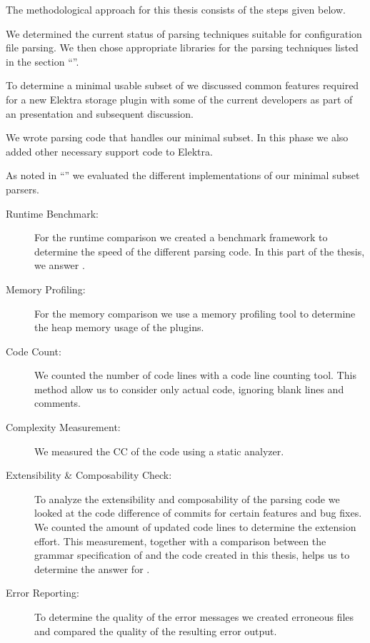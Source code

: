 The methodological approach for this thesis consists of the steps given below.

\begin{description}[style=multiline, leftmargin=3.2cm, font=\bfseries]

  \item[Literature Review] We determined the current status of parsing techniques suitable for configuration file parsing. We then chose appropriate libraries for the parsing techniques listed in the section “”.

  \item[Discussion] To determine a minimal usable subset of  we discussed common features required for a new Elektra storage plugin with some of the current developers as part of an presentation and subsequent discussion.

  \item[Implementation] We wrote parsing code that handles our minimal  subset. In this phase we also added other necessary support code to Elektra.

  \item[Comparison] As noted in “” we evaluated the different implementations of our minimal  subset parsers.

  \begin{description}
    \item[Runtime Benchmark:] For the runtime comparison we created a benchmark framework to determine the speed of the different parsing code. In this part of the thesis, we answer .

    \item[Memory Profiling:] For the memory comparison we use a memory profiling tool to determine the heap memory usage of the  plugins.

    \item[Code Count:] We counted the number of code lines with a code line counting tool. This method allow us to consider only actual code, ignoring blank lines and comments.

    \item[Complexity Measurement:] We measured the \gls{CC} of the code using a static analyzer.

    \item[Extensibility \& Composability Check:] To analyze the extensibility and composability of the parsing code we looked at the code difference of commits for certain features and bug fixes. We counted the amount of updated code lines to determine the extension effort. This measurement, together with a comparison between the grammar specification of  and the code created in this thesis, helps us to determine the answer for .

    \item[Error Reporting:] To determine the quality of the error messages we created erroneous files and compared the quality of the resulting error output.
  \end{description}

\end{description}

